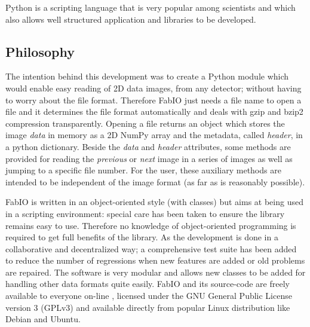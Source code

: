 \documentclass[preprint ]{iucr}
\begin{document}
Python \cite{python} is a scripting language that is very popular among scientists
and which also allows well structured application and libraries to be developed.

\subsection{Philosophy}

The intention behind this development was to create a Python module which would
enable easy reading of 2D data images, from any detector; without having to
worry about the file format.
Therefore FabIO just needs a file name to open a file and it determines the
file format automatically and deals with gzip \cite{gzip} and bzip2
\cite{bzip2} compression transparently.
Opening a file returns an object which stores the image
{\em data} in memory as a 2D NumPy array \cite{numpy} and the metadata,
called {\em header}, in a python dictionary. Beside the
{\em data} and {\em header} attributes, some methods are provided for reading
the {\em previous} or {\em next} image in a series of images as well as jumping
to a specific file number.
For the user, these auxiliary methods are intended to be independent of
the image format (as far as is reasonably possible).

FabIO is written in an object-oriented style (with classes) but aims at being
used in a scripting environment: special care has been taken to ensure the 
library remains easy to use. 
Therefore no knowledge of object-oriented programming is required to get 
full benefits of the library. 
As the development is done in a collaborative and decentralized way; a
comprehensive test suite has been added to reduce the number of regressions
when new features are added or old problems are repaired. 
The software is very modular and allows new classes to be added for handling 
other data formats quite easily.
FabIO and its source-code are freely available to everyone on-line \cite{fabio}, 
licensed under the GNU General Public License version 3 (GPLv3) and available
directly from popular Linux distribution like Debian and Ubuntu.
\end{document}
